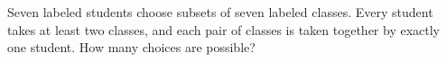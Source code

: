Seven labeled students choose subsets of seven labeled classes. Every student takes at least two classes, and each pair of classes is taken together by exactly one student. How many choices are possible?

